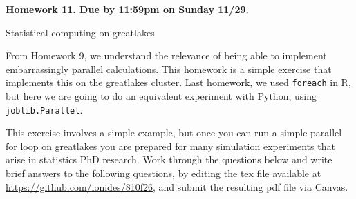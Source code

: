 \documentclass[12pt]{article}
\begin{document}
\begin{center}\bf
Homework 11. Due by 11:59pm on Sunday 11/29.

Statistical computing on greatlakes

\end{center}

From Homework 9, we understand the relevance of being able to implement embarrassingly parallel calculations. This homework is a simple exercise that implements this on the greatlakes cluster. Last homework, we used \texttt{foreach} in R, but here we are going to do an equivalent experiment with Python, using \texttt{joblib.Parallel}.

This exercise involves a simple example, but once you can run a simple parallel for loop on greatlakes you are prepared for many simulation experiments that arise in statistics PhD research. Work through the questions below and write brief answers to the following questions, by editing the tex file available at \url{https://github.com/ionides/810f26}, and submit the resulting pdf file via Canvas.
\end{document}
